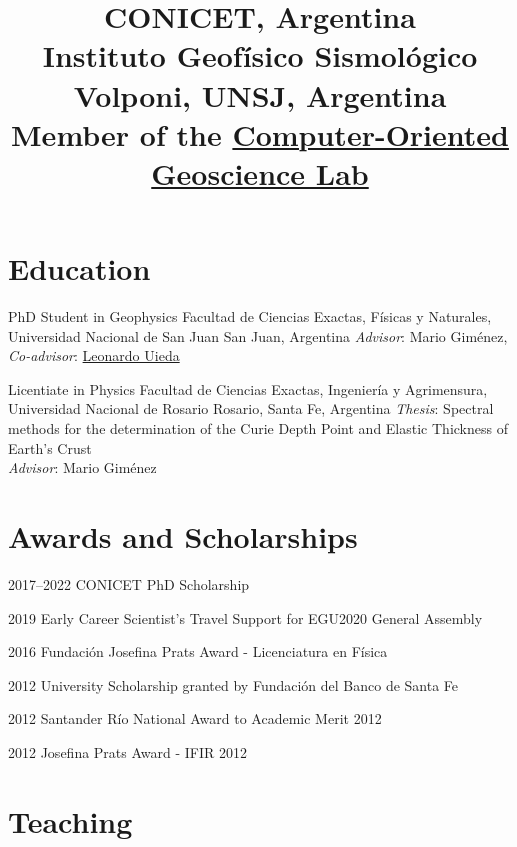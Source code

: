 \documentclass[a4paper,12pt,sans,colorlinks]{moderncv/moderncv}
\title{
    \small
    CONICET, Argentina
    \\
    Instituto Geofísico Sismológico Volponi, UNSJ, Argentina
    \\
    Member of the
    \href{https://www.compgeolab.org}{Computer-Oriented Geoscience Lab}
}
\newcommand{\leo}{\href{https://www.leouieda.com}{Leonardo Uieda}}
\newcommand{\mario}{Mario Giménez}
\begin{document}

\maketitle


\section{Education}

{PhD Student in Geophysics}
{
    Facultad de Ciencias Exactas, Físicas y Naturales,
    Universidad Nacional de San Juan
}
{San Juan, Argentina}
{}
{\emph{Advisor}: \mario{}, \emph{Co-advisor}: \leo{}}

{Licentiate in Physics}
{
    Facultad de Ciencias Exactas, Ingeniería y Agrimensura,
    Universidad Nacional de Rosario
}
{Rosario, Santa Fe, Argentina}
{}
{
    \emph{Thesis}: Spectral methods for the determination of the Curie Depth
    Point and Elastic Thickness of Earth's Crust
    \\
    \emph{Advisor}: \mario{}
}


\section{Awards and Scholarships}

\cvline
{2017--2022}
{CONICET PhD Scholarship}

\cvline
{2019}
{Early Career Scientist's Travel Support for EGU2020 General Assembly}

\cvline
{2016}
{Fundación Josefina Prats Award - Licenciatura en Física}

\cvline
{2012}
{University Scholarship granted by Fundación del Banco de Santa Fe}

\cvline
{2012}
{Santander Río National Award to Academic Merit 2012}

\cvline
{2012}
{Josefina Prats Award - IFIR 2012}



\section{Teaching}
\end{document}
